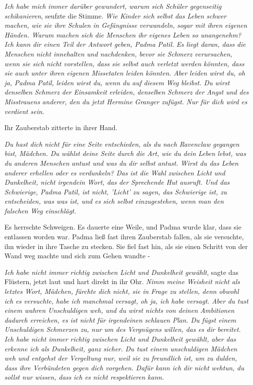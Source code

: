 \glqq{}\emph{Ich habe mich immer darüber gewundert, warum sich Schüler
gegenseitig schikanieren}\grqq{}, seufzte die Stimme. \glqq{}\emph{Wie Kinder
sich selbst das Leben schwer machen, wie sie ihre Schulen in Gefängnisse
verwandeln, sogar mit ihren eigenen Händen. Warum machen sich die Menschen ihr
eigenes Leben so unangenehm? Ich kann dir einen Teil der Antwort geben, Padma
Patil.} \emph{ Es liegt daran, dass die Menschen nicht innehalten und
nachdenken, bevor sie Schmerz verursachen, wenn sie sich nicht vorstellen, dass
sie selbst auch verletzt werden könnten, dass sie auch unter ihren eigenen
Missetaten leiden könnten. Aber leiden wirst du, oh ja, Padma Patil, leiden
wirst du, wenn du auf diesem Weg bleibst. Du wirst denselben Schmerz der
Einsamkeit erleiden, denselben Schmerz der Angst und des Misstrauens anderer,
den du jetzt Hermine Granger zufügst. Nur für dich wird es verdient sein.}\grqq{}

Ihr Zauberstab zitterte in ihrer Hand.

\glqq{}\emph{Du hast dich nicht für eine Seite entschieden, als du nach Ravenclaw
gegangen bist, Mädchen. Du wählst deine Seite durch die Art, wie du dein Leben
lebst, was du anderen Menschen antust und was du dir selbst antust. Wirst du das
Leben anderer erhellen oder es verdunkeln? Das ist die Wahl zwischen Licht und
Dunkelheit, nicht irgendein Wort, das der Sprechende Hut ausruft. Und das
Schwierige, Padma Patil, ist nicht, 'Licht' zu sagen, das Schwierige ist, zu
entscheiden, was was ist, und es sich selbst einzugestehen, wenn man den
falschen Weg einschlägt.}\grqq{}

Es herrschte Schweigen. Es dauerte eine Weile, und Padma wurde klar, dass sie
entlassen worden war. Padma ließ fast ihren Zauberstab fallen, als sie
versuchte, ihn wieder in ihre Tasche zu stecken. Sie fiel fast hin, als sie
einen Schritt von der Wand weg machte und sich zum Gehen wandte -

\glqq{}\emph{Ich habe nicht immer richtig zwischen Licht und Dunkelheit
gewählt}\grqq{}, sagte das Flüstern, jetzt laut und hart direkt in ihr Ohr.
\glqq{}\emph{Nimm meine Weisheit nicht als letztes Wort, Mädchen, fürchte dich
nicht, sie in Frage zu stellen, denn obwohl ich es versuchte, habe ich manchmal
versagt, oh ja, ich habe versagt. Aber du tust einem wahren Unschuldigen weh,
und du wirst nichts von deinen Ambitionen dadurch erreichen, es ist nicht für
irgendeinen schlauen Plan. Du fügst einem Unschuldigen Schmerzen zu, nur um des
Vergnügens willen, das es dir bereitet. Ich habe nicht immer richtig zwischen
Licht und Dunkelheit gewählt, aber das erkenne ich als Dunkelheit, ganz sicher.
Du tust einem unschuldigen Mädchen weh und entgehst der Vergeltung nur, weil sie
zu freundlich ist, um zu dulden, dass ihre Verbündeten gegen dich vorgehen.
Dafür kann ich dir nicht wehtun, du sollst nur wissen, dass ich es nicht
respektieren kann.}

